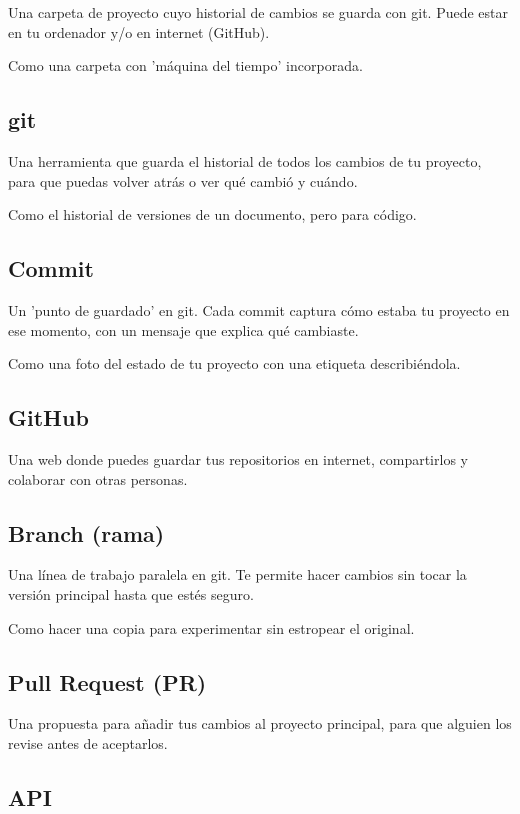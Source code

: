 \documentclass[11pt,a4paper]{report}
\begin{document}
Una carpeta de proyecto cuyo historial de cambios se guarda con git. Puede estar en tu ordenador y/o en internet (GitHub).

Como una carpeta con 'máquina del tiempo' incorporada.

\subsection{git}

Una herramienta que guarda el historial de todos los cambios de tu proyecto, para que puedas volver atrás o ver qué cambió y cuándo.

Como el historial de versiones de un documento, pero para código.

\subsection{Commit}

Un 'punto de guardado' en git. Cada commit captura cómo estaba tu proyecto en ese momento, con un mensaje que explica qué cambiaste.

Como una foto del estado de tu proyecto con una etiqueta describiéndola.

\subsection{GitHub}

Una web donde puedes guardar tus repositorios en internet, compartirlos y colaborar con otras personas.

\subsection{Branch (rama)}

Una línea de trabajo paralela en git. Te permite hacer cambios sin tocar la versión principal hasta que estés seguro.

Como hacer una copia para experimentar sin estropear el original.

\subsection{Pull Request (PR)}

Una propuesta para añadir tus cambios al proyecto principal, para que alguien los revise antes de aceptarlos.

\subsection{API}
\end{document}

